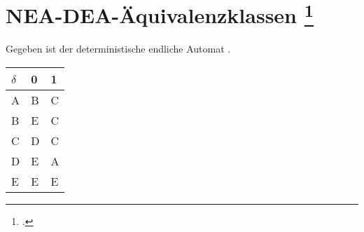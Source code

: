 \documentclass{bschlangaul-aufgabe}
\begin{document}
\let\f=\bFussnote
\let\l=\bLeereZelle
\def\Z#1#2{(#1, #2)}

\section{NEA-DEA-Äquivalenzklassen
\footcite[Seite 11, Aufgabe 7]{theo:ab:1}}

Gegeben ist der deterministische endliche Automat
.

\begin{center}
\begin{tabular}{l||l|l}
$\delta$ & 0 & 1 \\\hline\hline
A & B & C \\\hline
B & E & C \\\hline
C & D & C \\\hline
D & E & A \\\hline
E & E & E \\\hline
\end{tabular}
\end{center}
\end{document}
